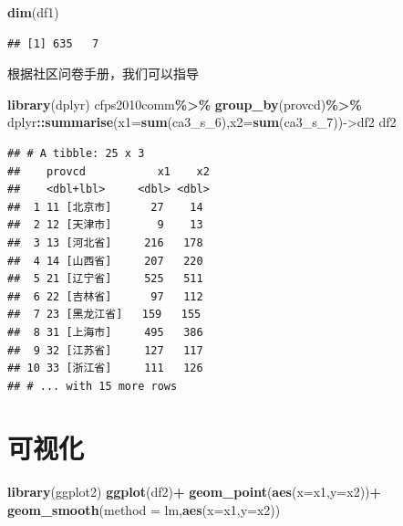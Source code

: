 \documentclass[
]{book}
\newenvironment{Shaded}{\begin{snugshade}}{\end{snugshade}}
\newcommand{\AttributeTok}[1]{\textcolor[rgb]{0.13,0.29,0.53}{#1}}
\newcommand{\FunctionTok}[1]{\textcolor[rgb]{0.13,0.29,0.53}{\textbf{#1}}}
\newcommand{\NormalTok}[1]{#1}
\newcommand{\OtherTok}[1]{\textcolor[rgb]{0.56,0.35,0.01}{#1}}
\newcommand{\SpecialCharTok}[1]{\textcolor[rgb]{0.81,0.36,0.00}{\textbf{#1}}}
\newcommand{\StringTok}[1]{\textcolor[rgb]{0.31,0.60,0.02}{#1}}
\begin{document}
\begin{Shaded}
\begin{Highlighting}[]
\FunctionTok{dim}\NormalTok{(df1)}
\end{Highlighting}
\end{Shaded}

\begin{verbatim}
## [1] 635   7
\end{verbatim}

根据社区问卷手册，我们可以指导

\begin{Shaded}
\begin{Highlighting}[]
\FunctionTok{library}\NormalTok{(dplyr)}
\NormalTok{cfps2010comm}\SpecialCharTok{\%\textgreater{}\%}
  \FunctionTok{group\_by}\NormalTok{(provcd)}\SpecialCharTok{\%\textgreater{}\%}
\NormalTok{  dplyr}\SpecialCharTok{::}\FunctionTok{summarise}\NormalTok{(}\AttributeTok{x1=}\FunctionTok{sum}\NormalTok{(ca3\_s\_6),}\AttributeTok{x2=}\FunctionTok{sum}\NormalTok{(ca3\_s\_7))}\OtherTok{{-}\textgreater{}}\NormalTok{df2}
\NormalTok{df2}
\end{Highlighting}
\end{Shaded}

\begin{verbatim}
## # A tibble: 25 x 3
##    provcd           x1    x2
##    <dbl+lbl>     <dbl> <dbl>
##  1 11 [北京市]      27    14
##  2 12 [天津市]       9    13
##  3 13 [河北省]     216   178
##  4 14 [山西省]     207   220
##  5 21 [辽宁省]     525   511
##  6 22 [吉林省]      97   112
##  7 23 [黑龙江省]   159   155
##  8 31 [上海市]     495   386
##  9 32 [江苏省]     127   117
## 10 33 [浙江省]     111   126
## # ... with 15 more rows
\end{verbatim}

\hypertarget{ux53efux89c6ux5316}{%
\section{可视化}\label{ux53efux89c6ux5316}}

\begin{Shaded}
\begin{Highlighting}[]
\FunctionTok{library}\NormalTok{(ggplot2)}
\FunctionTok{ggplot}\NormalTok{(df2)}\SpecialCharTok{+}
  \FunctionTok{geom\_point}\NormalTok{(}\FunctionTok{aes}\NormalTok{(}\AttributeTok{x=}\NormalTok{x1,}\AttributeTok{y=}\NormalTok{x2))}\SpecialCharTok{+}
  \FunctionTok{geom\_smooth}\NormalTok{(}\AttributeTok{method =} \StringTok{\textquotesingle{}lm\textquotesingle{}}\NormalTok{,}\FunctionTok{aes}\NormalTok{(}\AttributeTok{x=}\NormalTok{x1,}\AttributeTok{y=}\NormalTok{x2))}
\end{Highlighting}
\end{Shaded}
\end{document}
